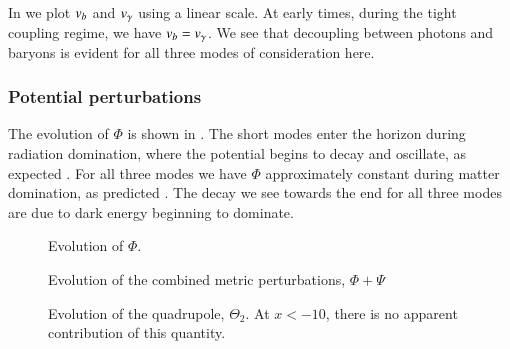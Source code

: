 In  we plot $v_b$ and $v_\gamma$ using a linear scale. At early times, during the tight coupling regime, we have $v_b=v_\gamma$. We see that decoupling between photons and baryons is evident for all three modes of consideration here.  



\subsubsection{Potential perturbations} \label{sssec:M3:results:metric_perturbations}
The evolution of $\Phi$ is shown in . The short modes enter the horizon during radiation domination, where the potential begins to decay and oscillate, as expected . For all three modes we have $\Phi$ approximately constant during matter domination, as predicted . The decay we see towards the end for all three modes are due to dark energy beginning to dominate. 
\begin{figure}[ht!]
    \caption{Evolution of $\Phi$.}
    \label{fig:M3:results:Phi}
\end{figure}


\begin{figure}[ht!]
    \caption{Evolution of the combined metric perturbations, $\Phi+\Psi$}
    \label{fig:M3:results:Phi_plus_Psi}
\end{figure}



\begin{figure}[ht!]
    \caption{Evolution of the quadrupole, $\Theta_2$. At $x<-10$, there is no apparent contribution of this quantity.}
    \label{fig:M3:results:Theta2}
\end{figure}
